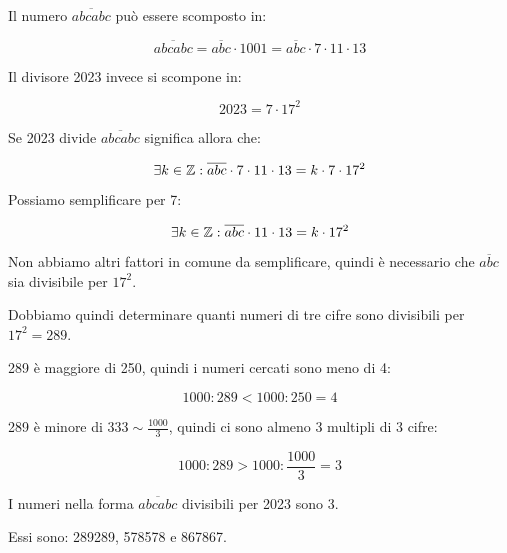 \begin{soluzione}
    Il numero $\overline{abcabc}$ può essere scomposto in:

    \begin{equation*}
        \overline{abcabc} = \overline{abc} \cdot 1001 = \overline{abc} \cdot 7 \cdot 11 \cdot 13
    \end{equation*}

    Il divisore 2023 invece si scompone in:

    \begin{equation*}
        2023 = 7 \cdot 17^2
    \end{equation*}

    Se 2023 divide $\overline{abcabc}$ significa allora che:

    \begin{equation*}
        \exists k \in  \mathbb{Z} : \overline{abc} \cdot 7 \cdot 11 \cdot 13 = k \cdot 7 \cdot 17^2
    \end{equation*}

    Possiamo semplificare per 7:

    \begin{equation*}
        \exists k \in  \mathbb{Z} : \overline{abc} \cdot 11 \cdot 13 = k \cdot 17^2
    \end{equation*}

    Non abbiamo altri fattori in comune da semplificare, quindi è necessario che $\overline{abc}$ sia divisibile per
    $17^2$.

    Dobbiamo quindi determinare quanti numeri di tre cifre sono divisibili per $17^2 = 289$.

    289 è maggiore di 250, quindi i numeri cercati sono meno di 4:

    \begin{equation*}
        1000 : 289 < 1000 : 250 = 4
    \end{equation*}

    289 è minore di $333 \sim \frac{1000}{3}$, quindi ci sono almeno 3 multipli di 3 cifre:

    \begin{equation*}
        1000 : 289 > 1000 : \frac{1000}{3} = 3
    \end{equation*}

    \bigskip
    I numeri nella forma $\overline{abcabc}$ divisibili per 2023 sono 3.

    Essi sono: 289289, 578578 e 867867.

\end{soluzione}
